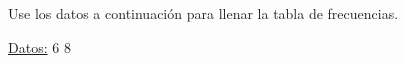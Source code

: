 \documentclass{cdplf-prueba}
\begin{document}
\subsection{}

Use los datos a continuación para llenar la tabla de frecuencias.

\underline{Datos:} \hspace{4pt} 6 \hspace{4pt}\textbullet\hspace{4pt} 8 \hspace{4pt}\textbullet
\end{document}
